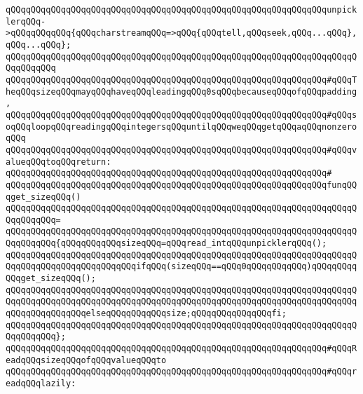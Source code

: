 \newline
\verb|qQQqqQQqqQQqqQQqqQQqqQQqqQQqqQQqqQQqqQQqqQQqqQQqqQQqqQQqqQQqqQQqunpicklerqQQq->qQQqqQQqqQQq{qQQqcharstreamqQQq=>qQQq{qQQqtell,qQQqseek,qQQq...qQQq},qQQq...qQQq};|\newline
\verb|qQQqqQQqqQQqqQQqqQQqqQQqqQQqqQQqqQQqqQQqqQQqqQQqqQQqqQQqqQQqqQQqqQQqqQQqqQQqqQQq|\newline
\newline
\verb|qQQqqQQqqQQqqQQqqQQqqQQqqQQqqQQqqQQqqQQqqQQqqQQqqQQqqQQqqQQqqQQq#qQQqTheqQQqsizeqQQqmayqQQqhaveqQQqleadingqQQq0sqQQqbecauseqQQqofqQQqpadding,|\newline
\verb|qQQqqQQqqQQqqQQqqQQqqQQqqQQqqQQqqQQqqQQqqQQqqQQqqQQqqQQqqQQqqQQq#qQQqsoqQQqloopqQQqreadingqQQqintegersqQQquntilqQQqweqQQqgetqQQqaqQQqnonzeroqQQq|\newline
\verb|qQQqqQQqqQQqqQQqqQQqqQQqqQQqqQQqqQQqqQQqqQQqqQQqqQQqqQQqqQQqqQQq#qQQqvalueqQQqtoqQQqreturn:|\newline
\verb|qQQqqQQqqQQqqQQqqQQqqQQqqQQqqQQqqQQqqQQqqQQqqQQqqQQqqQQqqQQqqQQq#|\newline
\verb|qQQqqQQqqQQqqQQqqQQqqQQqqQQqqQQqqQQqqQQqqQQqqQQqqQQqqQQqqQQqqQQqfunqQQqget_sizeqQQq()|\newline
\verb|qQQqqQQqqQQqqQQqqQQqqQQqqQQqqQQqqQQqqQQqqQQqqQQqqQQqqQQqqQQqqQQqqQQqqQQqqQQqqQQq=|\newline
\verb|qQQqqQQqqQQqqQQqqQQqqQQqqQQqqQQqqQQqqQQqqQQqqQQqqQQqqQQqqQQqqQQqqQQqqQQqqQQqqQQq{qQQqqQQqqQQqsizeqQQq=qQQqread_intqQQqunpicklerqQQq();|\newline
\newline
\verb|qQQqqQQqqQQqqQQqqQQqqQQqqQQqqQQqqQQqqQQqqQQqqQQqqQQqqQQqqQQqqQQqqQQqqQQqqQQqqQQqqQQqqQQqqQQqqQQqifqQQq(sizeqQQq==qQQq0qQQqqQQqqQQq)qQQqqQQqqQQqget_sizeqQQq();|\newline
\verb|qQQqqQQqqQQqqQQqqQQqqQQqqQQqqQQqqQQqqQQqqQQqqQQqqQQqqQQqqQQqqQQqqQQqqQQqqQQqqQQqqQQqqQQqqQQqqQQqqQQqqQQqqQQqqQQqqQQqqQQqqQQqqQQqqQQqqQQqqQQqqQQqqQQqqQQqqQQqelseqQQqqQQqqQQqsize;qQQqqQQqqQQqqQQqfi;|\newline
\verb|qQQqqQQqqQQqqQQqqQQqqQQqqQQqqQQqqQQqqQQqqQQqqQQqqQQqqQQqqQQqqQQqqQQqqQQqqQQqqQQq};|\newline
\newline
\newline
\verb|qQQqqQQqqQQqqQQqqQQqqQQqqQQqqQQqqQQqqQQqqQQqqQQqqQQqqQQqqQQqqQQq#qQQqReadqQQqsizeqQQqofqQQqvalueqQQqto|\newline
\verb|qQQqqQQqqQQqqQQqqQQqqQQqqQQqqQQqqQQqqQQqqQQqqQQqqQQqqQQqqQQqqQQq#qQQqreadqQQqlazily:|\newline
